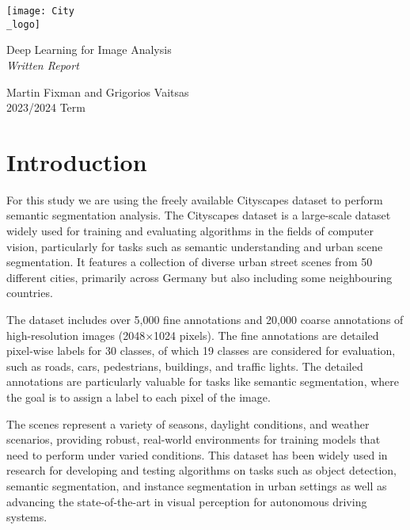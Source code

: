 \documentclass[a4paper,11pt]{article}
\begin{document}
\begin{titlepage}
	\centering
	\texttt{[image: City\\\_logo]} \\[4em]
	\begin{bfseries}
		\begin{Huge}
			Deep Learning for Image Analysis \\[35pt]
			\textsl{Written Report}
		\end{Huge}
	\end{bfseries}
	\vfill{}
	\begin{LARGE}
		\begin{sffamily}
			Martin Fixman and Grigorios Vaitsas \\[10pt]
			2023/2024 Term
		\end{sffamily}
	\end{LARGE}
\end{titlepage}

\section{Introduction}
For this study we are using the freely available Cityscapes dataset \cite{DBLP:journals/corr/CordtsORREBFRS16} to perform semantic segmentation analysis. The Cityscapes dataset is a large-scale dataset widely used for training and evaluating algorithms in the fields of computer vision, particularly for tasks such as semantic understanding and urban scene segmentation. It features a collection of diverse urban street scenes from 50 different cities, primarily across Germany but also including some neighbouring countries. 

The dataset includes over 5,000 fine annotations and 20,000 coarse annotations of high-resolution images (2048$\times$1024 pixels). The fine annotations are detailed pixel-wise labels for 30 classes, of which 19 classes are considered for evaluation, such as roads, cars, pedestrians, buildings, and traffic lights. The detailed annotations are particularly valuable for tasks like semantic segmentation, where the goal is to assign a label to each pixel of the image. 

The scenes represent a variety of seasons, daylight conditions, and weather scenarios, providing robust, real-world environments for training models that need to perform under varied conditions. This dataset has been widely used in research for developing and testing algorithms on tasks such as object detection, semantic segmentation, and instance segmentation in urban settings as well as advancing the state-of-the-art in visual perception for autonomous driving systems. 
\end{document}
